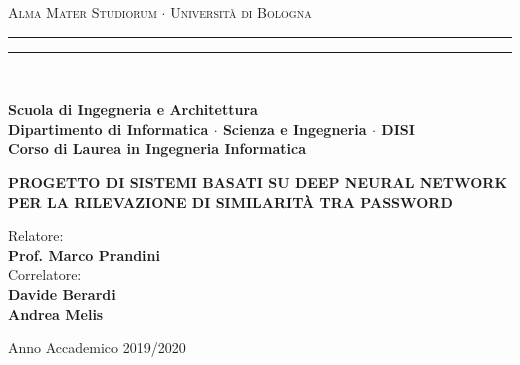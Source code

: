 \documentclass[12pt,a4paper]{report}
\begin{document}
\begin{titlepage}

\begin{center}
{{\Large{\textsc{Alma Mater Studiorum $\cdot$ Universit\`a di Bologna}}}} 
\rule[0.1cm]{15.8cm}{0.1mm}
\rule[0.5cm]{15.8cm}{0.6mm}
\\\vspace{3mm}

{\small{\bf Scuola di Ingegneria e Architettura \\ 
Dipartimento di Informatica $\cdot$ Scienza e Ingegneria $\cdot$ DISI\\
Corso di Laurea in Ingegneria Informatica}}


\end{center}

\vspace{23mm}

\begin{center}{
\large \bf PROGETTO DI SISTEMI BASATI SU DEEP NEURAL NETWORK PER LA
RILEVAZIONE DI SIMILARITÀ TRA PASSWORD\par
}\end{center}

\vspace{40mm} \par \noindent

\begin{minipage}[t]{0.47\textwidth}{
    \large{
        Relatore:
        \vspace{2mm}\\{
            \bf Prof. Marco Prandini
        }
        \vspace{6mm}\\
        {
            Correlatore:
            \vspace{2mm}\\
            \bf Davide Berardi\vspace{2mm}\\
            \bf Andrea Melis
        }
    }
}
\end{minipage}
%
\hfill
%
\begin{minipage}[t]{0.47\textwidth}
\end{minipage}

\vspace{40mm}

\begin{center}
Anno Accademico 2019/2020
\end{center}

\end{titlepage}
\end{document}
